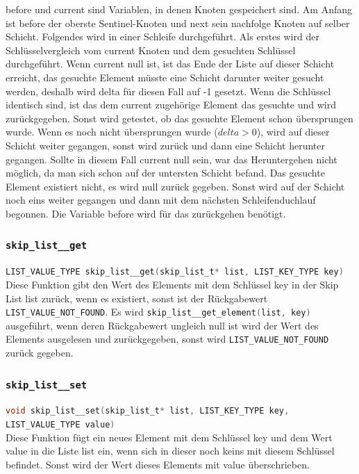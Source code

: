 \documentclass{TUBAFarbeiten}
\newcommand{\lstin}[1]{\lstinline[language=C]{#1}}
\begin{document}
before und current sind Variablen, in denen Knoten gespeichert sind.
Am Anfang ist before der oberste Sentinel-Knoten und next sein nachfolge Knoten auf selber Schicht.
Folgendes wird in einer Schleife durchgeführt.
Als erstes wird der Schlüsselvergleich vom current Knoten und dem gesuchten Schlüssel durchgeführt. Wenn current null ist, ist das Ende der Liste auf dieser Schicht erreicht, das gesuchte Element müsste eine Schicht darunter weiter gesucht werden, deshalb wird delta für diesen Fall auf -1 gesetzt.
Wenn die Schlüssel identisch sind, ist das dem current zugehörige Element das gesuchte und wird zurückgegeben.
Sonst wird getestet, ob das gesuchte Element schon übersprungen wurde. Wenn es noch nicht übersprungen wurde (\(delta > 0\)), wird auf dieser Schicht weiter gegangen, sonst wird zurück und dann eine Schicht herunter gegangen. Sollte in diesem Fall current null sein, war das Heruntergehen nicht möglich, da man sich schon auf der untersten Schicht befand. Das gesuchte Element existiert nicht, es wird null zurück gegeben. Sonst wird auf der Schicht noch eins weiter gegangen und dann mit dem nächsten Schleifenduchlauf begonnen.
Die Variable before wird für das zurückgehen benötigt.

\subsubsection{\lstin{skip_list__get}}

\lstin{LIST_VALUE_TYPE skip_list__get(skip_list_t* list, LIST_KEY_TYPE key)} \\

Diese Funktion gibt den Wert des Elements mit dem Schlüssel key in der Skip List list zurück, wenn es existiert, sonst ist der Rückgabewert \lstin{LIST_VALUE_NOT_FOUND}.
Es wird \lstin{skip_list__get_element(list, key)} ausgeführt, wenn deren Rückgabewert ungleich null ist wird der Wert des Elements ausgelesen und zurückgegeben, sonst wird \lstin{LIST_VALUE_NOT_FOUND} zurück gegeben.

\subsubsection{\lstin{skip_list__set}}

\lstin{void skip_list__set(skip_list_t* list, LIST_KEY_TYPE key, LIST_VALUE_TYPE value)} \\

Diese Funktion fügt ein neues Element mit dem Schlüssel key und dem Wert value in die Liste list ein, wenn sich in dieser noch keins mit diesem Schlüssel befindet. Sonst wird der Wert dieses Elements mit value überschrieben.
\end{document}
